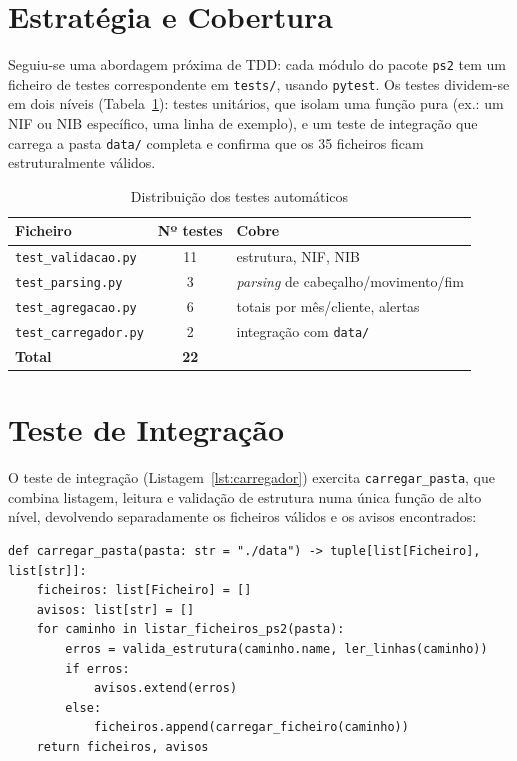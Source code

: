 \documentclass[11pt,a4paper]{report}
\begin{document}
\section{Estratégia e Cobertura}

Seguiu-se uma abordagem próxima de TDD: cada módulo do pacote \texttt{ps2}
tem um ficheiro de testes correspondente em \texttt{tests/}, usando
\texttt{pytest}. Os testes dividem-se em dois níveis (Tabela~\ref{tab:testes}):
testes unitários, que isolam uma função pura (ex.: um NIF ou NIB específico,
uma linha de exemplo), e um teste de integração que carrega a pasta
\texttt{data/} completa e confirma que os 35 ficheiros ficam estruturalmente
válidos.

\begin{table}[H]\centering
  \begin{tabular}{lcl}
    \textbf{Ficheiro} & \textbf{Nº testes} & \textbf{Cobre} \\ \hline
    \texttt{test\_validacao.py}  & 11 & estrutura, NIF, NIB \\
    \texttt{test\_parsing.py}    & 3  & \textit{parsing} de cabeçalho/movimento/fim \\
    \texttt{test\_agregacao.py}  & 6  & totais por mês/cliente, alertas \\
    \texttt{test\_carregador.py} & 2  & integração com \texttt{data/} \\ \hline
    \textbf{Total} & \textbf{22} & \\
  \end{tabular}
  \caption{Distribuição dos testes automáticos}\label{tab:testes}
\end{table}

\section{Teste de Integração}

O teste de integração (Listagem~\ref{lst:carregador}) exercita
\texttt{carregar\_pasta}, que combina listagem, leitura e validação de
estrutura numa única função de alto nível, devolvendo separadamente os
ficheiros válidos e os avisos encontrados:

\begin{lstlisting}[caption={Carregamento de alto nível (\texttt{ps2/carregador.py})},label=lst:carregador]
def carregar_pasta(pasta: str = "./data") -> tuple[list[Ficheiro], list[str]]:
    ficheiros: list[Ficheiro] = []
    avisos: list[str] = []
    for caminho in listar_ficheiros_ps2(pasta):
        erros = valida_estrutura(caminho.name, ler_linhas(caminho))
        if erros:
            avisos.extend(erros)
        else:
            ficheiros.append(carregar_ficheiro(caminho))
    return ficheiros, avisos
\end{lstlisting}
\end{document}
